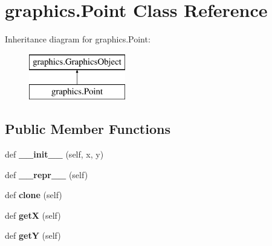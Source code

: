 \hypertarget{classgraphics_1_1_point}{}\section{graphics.\+Point Class Reference}
\label{classgraphics_1_1_point}
Inheritance diagram for graphics.\+Point\+:\begin{figure}[H]
\begin{center}
\leavevmode
\includegraphics[height=2.000000cm]{classgraphics_1_1_point}
\end{center}
\end{figure}
\subsection*{Public Member Functions}
\begin{DoxyCompactItemize}
\item 
def {\bfseries \+\_\+\+\_\+init\+\_\+\+\_\+} (self, x, y)\hypertarget{classgraphics_1_1_point_ab8786043f14e834312522f9a2635ca1c}{}\label{classgraphics_1_1_point_ab8786043f14e834312522f9a2635ca1c}

\item 
def {\bfseries \+\_\+\+\_\+repr\+\_\+\+\_\+} (self)\hypertarget{classgraphics_1_1_point_a8dabf610e2e2a1ecdcdadfd16d7c42f6}{}\label{classgraphics_1_1_point_a8dabf610e2e2a1ecdcdadfd16d7c42f6}

\item 
def {\bfseries clone} (self)\hypertarget{classgraphics_1_1_point_a533526af5c8fbfe84c7c0924c4af7fb5}{}\label{classgraphics_1_1_point_a533526af5c8fbfe84c7c0924c4af7fb5}

\item 
def {\bfseries getX} (self)\hypertarget{classgraphics_1_1_point_a8a19d0055571c7f1d68df9e9624272a6}{}\label{classgraphics_1_1_point_a8a19d0055571c7f1d68df9e9624272a6}

\item 
def {\bfseries getY} (self)\hypertarget{classgraphics_1_1_point_a48fb2d02f2abf906972cfdae9698fa17}{}\label{classgraphics_1_1_point_a48fb2d02f2abf906972cfdae9698fa17}

\end{DoxyCompactItemize}
